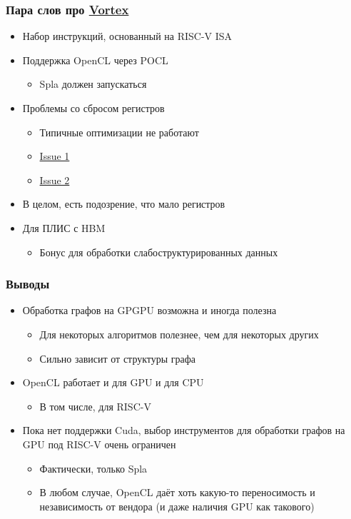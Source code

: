 \documentclass[xcolor=table,aspectratio=169]{beamer}
\begin{document}
\begin{frame}[fragile]
  \frametitle{Пара слов про \href{https://github.com/vortexgpgpu/vortex}{Vortex}}
  \begin{itemize}
    \item Набор инструкций, основанный на RISC-V ISA
    \item Поддержка OpenCL через POCL 
    \begin{itemize}
      \item[\faGears] Spla должен запускаться
    \end{itemize}
    \item Проблемы со сбросом регистров
    \begin{itemize}
      \item Типичные оптимизации не работают
      \item \href{https://github.com/vortexgpgpu/vortex/issues/251}{Issue 1}
      \item \href{https://github.com/vortexgpgpu/vortex/issues/205}{Issue 2}
    \end{itemize}
    \item В целом, есть подозрение, что мало регистров
    \item Для ПЛИС с HBM
    \begin{itemize}
      \item[\faQuestion] Бонус для обработки слабоструктурированных данных
    \end{itemize}
  \end{itemize}
\end{frame}

\begin{frame}[fragile]
  \frametitle{Выводы}
  \begin{itemize}
    \item Обработка графов на GPGPU возможна и иногда полезна
    \begin{itemize}
      \item Для некоторых алгоритмов полезнее, чем для некоторых других
      \item Сильно зависит от структуры графа
    \end{itemize}
    \item OpenCL работает и для GPU и для CPU
    \begin{itemize}
      \item В том числе, для RISC-V      
    \end{itemize}
    \item Пока нет поддержки Cuda, выбор инструментов для обработки графов на GPU под RISC-V очень ограничен
    \begin{itemize}
      \item Фактически, только Spla
      \item В любом случае, OpenCL даёт хоть какую-то переносимость и независимость от вендора (и даже наличия GPU как такового)
    \end{itemize}
  \end{itemize}
\end{frame}
 
\end{document}

